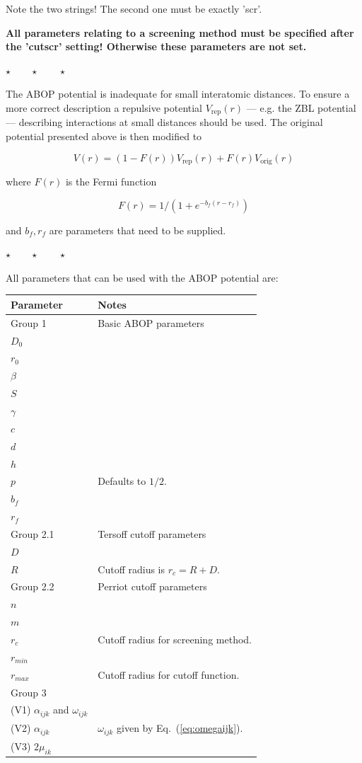 \documentclass[a4paper,12pt,pdftex,onecolumn]{article}
\newcommand{\stars}{\begin{center}%
\vspace{1em plus 0.5em minus 0.5em}%
$\star \qquad \star \qquad \star$%
\vspace{1em plus 0.5em minus 0.5em}%
\end{center}}
\begin{document}
Note the two strings! The second one must be exactly 'scr'.

\textbf{All parameters relating to a screening method must be specified after the 'cutscr'
setting! Otherwise these parameters are not set.}

\stars

The ABOP potential is inadequate for small interatomic distances.
To ensure a more correct description a repulsive potential
$V_{\mathrm{rep}}(r)$ --- e.g. the ZBL potential --- describing
interactions at small distances should be used.
The original potential presented above is then modified to

\begin{equation}
V(r) = (1-F(r)) V_{\mathrm{rep}}(r) + F(r) V_{\mathrm{orig}}(r)
\end{equation}

where $F(r)$ is the Fermi function

\begin{equation}
F(r) = 1/(1 + e^{-b_f(r-r_f)})
\end{equation}

and $b_f, r_f$ are parameters that need to be supplied.

\stars

All parameters that can be used with the ABOP potential are:

\begin{center}
\begin{tabular}{|l|l|}
\hline
\hline
Parameter & Notes \\
\hline
\hline
Group 1 & Basic ABOP parameters \\
\hline
$D_0$ & \\
$r_0$ & \\
$\beta$ & \\
$S$ & \\
$\gamma$ & \\
$c$ & \\
$d$ & \\
$h$ & \\
$p$ & Defaults to $1/2$. \\
$b_f$ & \\
$r_f$ & \\
\hline
Group 2.1 & Tersoff cutoff parameters \\
\hline
$D$ & \\
$R$ & Cutoff radius is $r_c = R + D$. \\
\hline
Group 2.2 & Perriot cutoff parameters \\
\hline
$n$ & \\
$m$ & \\
$r_c$ & Cutoff radius for screening method. \\
$r_{min}$ & \\
$r_{max}$ & Cutoff radius for cutoff function. \\
\hline
Group 3 & \\
\hline
(V1) $\alpha_{ijk}$ and $\omega_{ijk}$ & \\
(V2) $\alpha_{ijk}$ & $\omega_{ijk}$ given by Eq.~(\ref{eq:omegaijk}).\\
(V3) $2\mu_{ik}$ & \\
\hline
\hline
\end{tabular}
\end{center}
\end{document}
